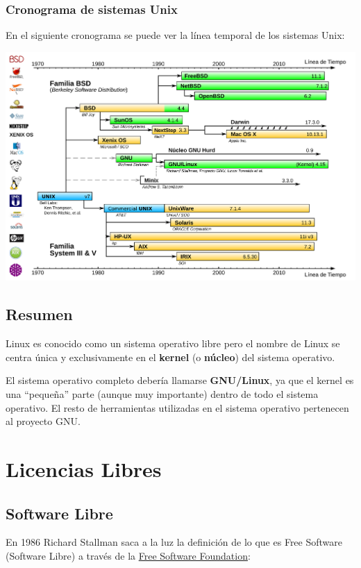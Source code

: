 \documentclass{../../../yukibook.cls/yukibook}
\begin{document}
\subsection{Cronograma de sistemas Unix}
En el siguiente cronograma se puede ver la línea temporal de los sistemas Unix:

\begin{center}
  \includegraphics[width=0.7\linewidth]{img/Evolución_UNIX.png}
  \vspace{-10pt}
\end{center}

\section{Resumen}
Linux es conocido como un sistema operativo libre pero el nombre de Linux se  centra única y exclusivamente en el \textbf{kernel} (o \textbf{núcleo}) del sistema operativo.

El sistema operativo completo debería llamarse \textbf{GNU/Linux}, ya que el kernel es una “pequeña” parte (aunque muy importante) dentro de todo el sistema operativo. El resto de herramientas utilizadas en el sistema operativo pertenecen al proyecto GNU.


\chapter{Licencias Libres}
\section{Software Libre}

En 1986 Richard Stallman saca a la luz la definición de lo que es Free Software (Software Libre) a través de la \href{https://es.wikipedia.org/wiki/Free_Software_Foundation}{Free Software Foundation}:
\end{document}
